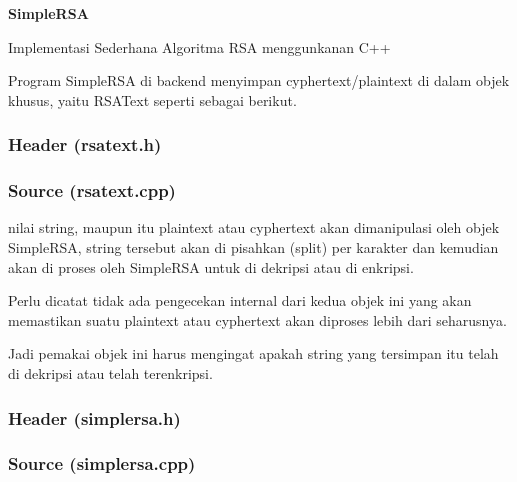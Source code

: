 \documentclass[11pt, a4paper]{article}
\date{}
\begin{document}
     \begin{center}
         \vspace*{1cm}

         \textbf{\Huge{SimpleRSA}}

         \vspace{0.2cm}

         Implementasi Sederhana Algoritma RSA menggunkanan C++

         \vspace{0.2cm}

     \end{center}


  Program SimpleRSA di backend menyimpan cyphertext/plaintext di dalam objek khusus,
  yaitu RSAText seperti sebagai berikut.

    \subsubsection*{Header (rsatext.h)}
      

    \newpage

    \subsubsection*{Source (rsatext.cpp)}
      

  nilai string, maupun itu plaintext atau cyphertext akan dimanipulasi oleh objek SimpleRSA,
  string tersebut akan di pisahkan (split) per karakter dan kemudian akan di proses oleh
  SimpleRSA untuk di dekripsi atau di enkripsi.

  Perlu dicatat tidak ada pengecekan internal dari kedua objek ini yang akan
  memastikan suatu plaintext atau cyphertext akan diproses lebih dari seharusnya.

  Jadi pemakai objek ini harus mengingat apakah string yang tersimpan
  itu telah di dekripsi atau telah terenkripsi.

   \vspace{0.2cm}

    \subsubsection*{Header (simplersa.h)}
      

    \newpage

    \subsubsection*{Source (simplersa.cpp)}
      
\end{document}
